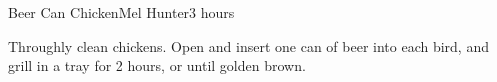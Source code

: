 \begin{recipe}{Beer Can Chicken}{Mel Hunter}{3 hours}
  
  Throughly clean chickens. Open and insert one can of beer into each
  bird, and grill in a tray for 2 hours, or until golden brown.
\end{recipe}
